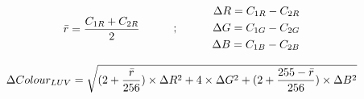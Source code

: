 \begin{equation}
\begin{split}
\label{eq:RedMeanRGBDiff}
\bar{r} = \frac{C_{1R} + C_{2R}}{2}
\end{split}
\quad\quad\quad ; \quad\quad\quad
 \begin{split}
\Delta R = C_{1R} - C_{2R}\\ 
\Delta G = C_{1G} - C_{2G}\\ 
\Delta B = C_{1B} - C_{2B}
 \end{split}
\end{equation}

\begin{equation}
\label{eq:DiffColorLUV}
\Delta Colour_{LUV} = \sqrt{(2 + \frac{\bar{r}}{256}) \times \Delta R^{2} + 4 \times \Delta G^{2} + (2 + \frac{255 - \bar{r}}{256}) \times \Delta B^{2} }
\end{equation}







